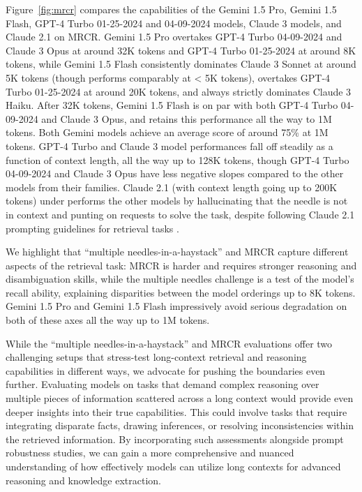 Figure~\ref{fig:mrcr} compares the capabilities of the Gemini 1.5 Pro, Gemini 1.5 Flash, GPT-4 Turbo 01-25-2024 and 04-09-2024 models, Claude 3 models, and Claude 2.1 on MRCR. Gemini 1.5 Pro overtakes GPT-4 Turbo 04-09-2024 and Claude 3 Opus at around 32K tokens and GPT-4 Turbo 01-25-2024 at around 8K tokens, while Gemini 1.5 Flash consistently dominates Claude 3 Sonnet at around 5K tokens (though performs comparably at < 5K tokens), overtakes GPT-4 Turbo 01-25-2024 at around 20K tokens, and always strictly dominates Claude 3 Haiku. After 32K tokens, Gemini 1.5 Flash is on par with both GPT-4 Turbo 04-09-2024 and Claude 3 Opus, and retains this performance all the way to 1M tokens. Both Gemini models achieve an average score of around 75\% at 1M tokens. GPT-4 Turbo and Claude 3 model performances fall off steadily as a function of context length, all the way up to 128K tokens, though GPT-4 Turbo 04-09-2024 and Claude 3 Opus have less negative slopes compared to the other models from their families. Claude 2.1 (with context length going up to 200K tokens) under performs the other models by hallucinating that the needle is not in context and punting on requests to solve the task, despite following Claude 2.1 prompting guidelines for retrieval tasks \cite{claudeprompting}.

We highlight that ``multiple needles-in-a-haystack'' and MRCR capture different aspects of the retrieval task: MRCR is harder and requires stronger reasoning and disambiguation skills, while the multiple needles challenge is a test of the model's recall ability, explaining disparities between the model orderings up to 8K tokens. Gemini 1.5 Pro and Gemini 1.5 Flash impressively avoid serious degradation on both of these axes all the way up to 1M tokens.

While the ``multiple needles-in-a-haystack'' and MRCR evaluations offer two challenging setups that stress-test long-context retrieval and reasoning capabilities in different ways, we advocate for pushing the boundaries even further. Evaluating models on tasks that demand complex reasoning over multiple pieces of information scattered across a long context would provide even deeper insights into their true capabilities. This could involve tasks that require integrating disparate facts, drawing inferences, or resolving inconsistencies within the retrieved information. By incorporating such assessments alongside prompt robustness studies, we can gain a more comprehensive and nuanced understanding of how effectively models can utilize long contexts for advanced reasoning and knowledge extraction. 

